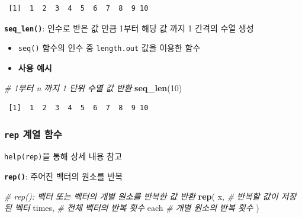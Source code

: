 \documentclass[
  11pt,
]{krantz}
\makeatletter
\newenvironment{Shaded}{\begin{snugshade}}{\end{snugshade}}
\newcommand{\CommentTok}[1]{\textcolor[rgb]{0.37,0.37,0.37}{\textit{#1}}}
\newcommand{\DecValTok}[1]{\textcolor[rgb]{0.06,0.06,0.06}{#1}}
\newcommand{\KeywordTok}[1]{\textcolor[rgb]{0.27,0.27,0.27}{\textbf{#1}}}
\newcommand{\NormalTok}[1]{#1}
\providecommand{\tightlist}{%
  \setlength{\itemsep}{0pt}\setlength{\parskip}{0pt}}
\newenvironment{kframe}{%
\medskip{}
\setlength{\fboxsep}{.8em}
 \def\at@end@of@kframe{}%
 \ifinner\ifhmode%
  \def\at@end@of@kframe{\end{minipage}}%
  \begin{minipage}{\columnwidth}%
 \fi\fi%
 \def\FrameCommand##1{\hskip\@totalleftmargin \hskip-\fboxsep
 \colorbox{shadecolor}{##1}\hskip-\fboxsep
     \hskip-\linewidth \hskip-\@totalleftmargin \hskip\columnwidth}%
 \MakeFramed {\advance\hsize-\width
   \@totalleftmargin\z@ \linewidth\hsize
   \@setminipage}}%
 {\par\unskip\endMakeFramed%
 \at@end@of@kframe}
\renewenvironment{quote}{\begin{kframe}}{\end{kframe}}
\makeatother
\begin{document}
\begin{verbatim}
 [1]  1  2  3  4  5  6  7  8  9 10
\end{verbatim}

\normalsize

\textbf{\texttt{seq\_len()}}: 인수로 받은 값 만큼 1부터 해당 값 까지 1 간격의 수열 생성

\begin{itemize}
\tightlist
\item
  \texttt{seq()} 함수의 인수 중 \texttt{length.out} 값을 이용한 함수
\item
  \textbf{사용 예시}
\end{itemize}

\footnotesize

\begin{Shaded}
\begin{Highlighting}[]
\CommentTok{# 1부터 n 까지 1 단위 수열 값 반환}
\KeywordTok{seq_len}\NormalTok{(}\DecValTok{10}\NormalTok{)}
\end{Highlighting}
\end{Shaded}

\begin{verbatim}
 [1]  1  2  3  4  5  6  7  8  9 10
\end{verbatim}

\normalsize

\hypertarget{fun-rep}{%
\subsubsection*{\texorpdfstring{\textbf{\texttt{rep}} 계열 함수}{rep 계열 함수}}\label{fun-rep}}


\begin{quote}
\texttt{help(rep)}을 통해 상세 내용 참고
\end{quote}

\textbf{\texttt{rep()}}: 주어진 벡터의 원소를 반복

\footnotesize

\begin{Shaded}
\begin{Highlighting}[]
\CommentTok{# rep(): 벡터 또는 벡터의 개별 원소를 반복한 값 반환}
\KeywordTok{rep}\NormalTok{(}
\NormalTok{  x, }\CommentTok{# 반복할 값이 저장된 벡터}
\NormalTok{  times, }\CommentTok{# 전체 벡터의 반복 횟수}
\NormalTok{  each }\CommentTok{# 개별 원소의 반복 횟수}
\NormalTok{)}
\end{Highlighting}
\end{Shaded}

\normalsize
\end{document}
